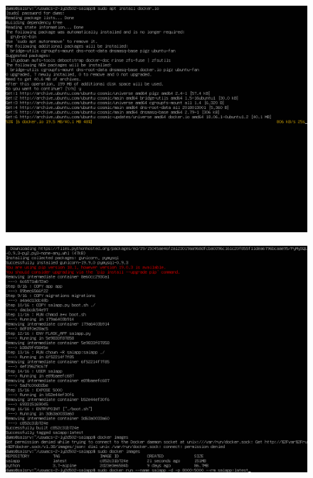 \begin{figure}[h!]
\centering
\captionsetup{skip=\skipfigurecaptionlen}
\includegraphics[width=1\textwidth]{screenshots/IY2D502-2019-02-21-23-29-41.png}
\caption{}
\label{fig:IY2D502-2019-02-21-23-29-41}
\end{figure}
\pagebreak
\begin{figure}[h!]
\centering
\captionsetup{skip=\skipfigurecaptionlen}
\includegraphics[width=1\textwidth]{screenshots/IY2D502-2019-02-21-23-43-07.png}
\caption{}
\label{fig:IY2D502-2019-02-21-23-43-07}
\end{figure}
\pagebreak
